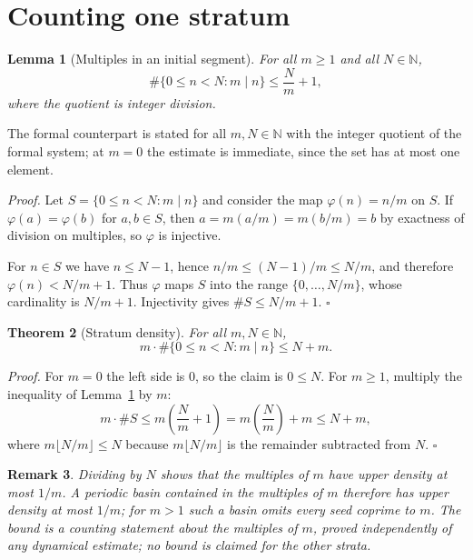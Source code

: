 \documentclass[11pt,letterpaper]{article}
\newcommand{\N}{\mathbb{N}}
\newtheorem{theorem}{Theorem}
\newtheorem{lemma}[theorem]{Lemma}
\newtheorem{remark}[theorem]{Remark}
\newenvironment{proof}{\noindent\textit{Proof.}}{\hfill\(\square\)}
\begin{document}
\section{Counting one stratum}

\begin{lemma}[Multiples in an initial segment]\label{Lem:OffsetMultipleCountLe}
For all $m\ge1$ and all $N\in\N$,
\[
 \#\{0\le n<N:m\mid n\}\le \frac{N}{m}+1,
\]
where the quotient is integer division.
\end{lemma}

The formal counterpart is stated for all $m,N\in\N$ with the integer quotient
of the formal system; at $m=0$ the estimate is immediate, since the set has at
most one element.

\begin{proof}
Let $S=\{0\le n<N:m\mid n\}$ and consider the map $\varphi(n)=n/m$ on $S$. If
$\varphi(a)=\varphi(b)$ for $a,b\in S$, then $a=m(a/m)=m(b/m)=b$ by exactness
of division on multiples, so $\varphi$ is injective.

For $n\in S$ we have $n\le N-1$, hence $n/m\le(N-1)/m\le N/m$, and therefore
$\varphi(n)<N/m+1$. Thus $\varphi$ maps $S$ into the range $\{0,\dots,N/m\}$,
whose cardinality is $N/m+1$. Injectivity gives $\#S\le N/m+1$.
\end{proof}

\begin{theorem}[Stratum density]\label{Thm:OffsetMultipleDensity}
For all $m,N\in\N$,
\[
 m\cdot\#\{0\le n<N:m\mid n\}\le N+m.
\]
\end{theorem}

\begin{proof}
For $m=0$ the left side is $0$, so the claim is $0\le N$. For $m\ge1$,
multiply the inequality of Lemma~\ref{Lem:OffsetMultipleCountLe} by $m$:
\[
 m\cdot\#S\le m\left(\frac{N}{m}+1\right)=m\left(\frac{N}{m}\right)+m\le N+m,
\]
where $m\lfloor N/m\rfloor\le N$ because $m\lfloor N/m\rfloor$ is the remainder
subtracted from $N$.
\end{proof}

\begin{remark}\label{Rem:OffsetDensityMeaning}
Dividing by $N$ shows that the multiples of $m$ have upper density at most
$1/m$. A periodic basin contained in the multiples of $m$ therefore has upper
density at most $1/m$; for $m>1$ such a basin omits every seed coprime to
$m$. The bound is a counting statement about the multiples of $m$, proved
independently of any dynamical estimate; no bound is claimed for the other
strata.
\end{remark}
\end{document}
